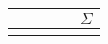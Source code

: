 \documentclass[%
a4paper, %
9pt,              %
leqno,            %
fleqn,            %
]
{scrartcl}
\begin{document}
\begin{center}
\begin{tabular}{c|c|c|c|c}
& & & & $\Sigma$\\\hline
& & & & \\
\end{tabular}
\end{center}
\end{document}

